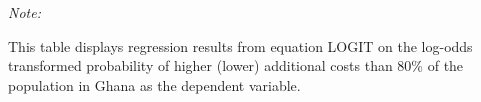 \begin{table}[htbp!]
\begin{adjustbox}{width = 1\textwidth, max height = 0.95\textheight, center}
\begin{threeparttable}[b]
         \begin{tablenotes}\item \medskip \textit{Note:}
            \item This table displays regression results from equation LOGIT on the log-odds transformed probability of higher (lower) additional costs than 80\% of the population in Ghana as the dependent variable. 
         \end{tablenotes}
      \end{threeparttable}
   \end{adjustbox}
\end{table}


